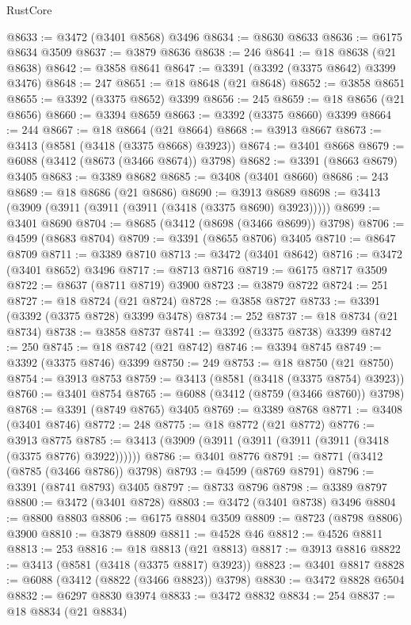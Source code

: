 \begin{lexlean}{RustCore}
\begin{coremodule}
@8633 := @3472 (@3401 @8568) @3496
@8634 := @8630 @8633
@8636 := @6175 @8634 @3509
@8637 := @3879 @8636
@8638 := 246
@8641 := @18 @8638 (@21 @8638)
@8642 := @3858 @8641
@8647 := @3391 (@3392 (@3375 @8642) @3399 @3476)
@8648 := 247
@8651 := @18 @8648 (@21 @8648)
@8652 := @3858 @8651
@8655 := @3392 (@3375 @8652) @3399
@8656 := 245
@8659 := @18 @8656 (@21 @8656)
@8660 := @3394 @8659
@8663 := @3392 (@3375 @8660) @3399
@8664 := 244
@8667 := @18 @8664 (@21 @8664)
@8668 := @3913 @8667
@8673 := @3413 (@8581 (@3418 (@3375 @8668) @3923))
@8674 := @3401 @8668
@8679 := @6088 (@3412 (@8673 (@3466 @8674)) @3798)
@8682 := @3391 (@8663 @8679) @3405
@8683 := @3389 @8682
@8685 := @3408 (@3401 @8660)
@8686 := 243
@8689 := @18 @8686 (@21 @8686)
@8690 := @3913 @8689
@8698 := @3413 (@3909 (@3911 (@3911 (@3911 (@3418 (@3375 @8690) @3923)))))
@8699 := @3401 @8690
@8704 := @8685 (@3412 (@8698 (@3466 @8699)) @3798)
@8706 := @4599 (@8683 @8704)
@8709 := @3391 (@8655 @8706) @3405
@8710 := @8647 @8709
@8711 := @3389 @8710
@8713 := @3472 (@3401 @8642)
@8716 := @3472 (@3401 @8652) @3496
@8717 := @8713 @8716
@8719 := @6175 @8717 @3509
@8722 := @8637 (@8711 @8719) @3900
@8723 := @3879 @8722
@8724 := 251
@8727 := @18 @8724 (@21 @8724)
@8728 := @3858 @8727
@8733 := @3391 (@3392 (@3375 @8728) @3399 @3478)
@8734 := 252
@8737 := @18 @8734 (@21 @8734)
@8738 := @3858 @8737
@8741 := @3392 (@3375 @8738) @3399
@8742 := 250
@8745 := @18 @8742 (@21 @8742)
@8746 := @3394 @8745
@8749 := @3392 (@3375 @8746) @3399
@8750 := 249
@8753 := @18 @8750 (@21 @8750)
@8754 := @3913 @8753
@8759 := @3413 (@8581 (@3418 (@3375 @8754) @3923))
@8760 := @3401 @8754
@8765 := @6088 (@3412 (@8759 (@3466 @8760)) @3798)
@8768 := @3391 (@8749 @8765) @3405
@8769 := @3389 @8768
@8771 := @3408 (@3401 @8746)
@8772 := 248
@8775 := @18 @8772 (@21 @8772)
@8776 := @3913 @8775
@8785 := @3413 (@3909 (@3911 (@3911 (@3911 (@3911 (@3418 (@3375 @8776) @3922))))))
@8786 := @3401 @8776
@8791 := @8771 (@3412 (@8785 (@3466 @8786)) @3798)
@8793 := @4599 (@8769 @8791)
@8796 := @3391 (@8741 @8793) @3405
@8797 := @8733 @8796
@8798 := @3389 @8797
@8800 := @3472 (@3401 @8728)
@8803 := @3472 (@3401 @8738) @3496
@8804 := @8800 @8803
@8806 := @6175 @8804 @3509
@8809 := @8723 (@8798 @8806) @3900
@8810 := @3879 @8809
@8811 := @4528 @46
@8812 := @4526 @8811
@8813 := 253
@8816 := @18 @8813 (@21 @8813)
@8817 := @3913 @8816
@8822 := @3413 (@8581 (@3418 (@3375 @8817) @3923))
@8823 := @3401 @8817
@8828 := @6088 (@3412 (@8822 (@3466 @8823)) @3798)
@8830 := @3472 @8828 @6504
@8832 := @6297 @8830 @3974
@8833 := @3472 @8832
@8834 := 254
@8837 := @18 @8834 (@21 @8834)

\end{coremodule}
\end{lexlean}
